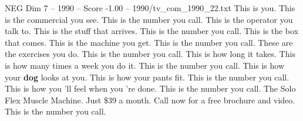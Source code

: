 \begin{textsample}{NEG Dim 7 – 1990 – Score -1.00 – 1990/tv\_com\_1990\_22.txt}  \label{ex:f7_neg_029}
This is you.
This is the commercial you see.
This is the number you call.
This is the operator you talk to.
This is the stuff that arrives.
This is the number you call.
This is the box that comes.
This is the machine you get.
This is the number you call.
These are the exercises you do.
This is the number you call.
This is how long it takes.
This is how many times a week you do it.
This is the number you call.
This is how your \textbf{dog} looks at you.
This is how your pants fit.
This is the number you call.
This is how you 'll feel when you 're done.
This is the number you call.
The Solo Flex Muscle Machine.
Just \$39 a month.
Call now for a free brochure and video.
This is the number you call.

\end{textsample}
